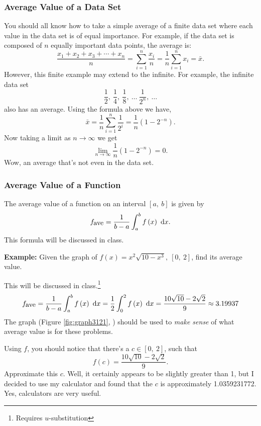 \documentclass[12pt,addpoints, answers, fleqn]{exam}
\begin{document}
\subsubsection{Average Value of a Data Set}

You should all know how to take a simple average of a finite data set where each value in the data set is of equal importance. For example, if the data set is composed of $n$ equally important data points, the average is:
\[
\frac{x_1 + x_2 + x_3 + \cdots + x_n}{n} = \sum\limits_{i = 1}^n \frac{x_i}{n} =  \frac{1}{n} \sum\limits_{i = 1}^n x_i = \bar x.
\]
However, this finite example may extend to the infinite. For example, the infinite data set
\[
\frac{1}{2}, \ \frac{1}{4}, \ \frac{1}{8}, \ \ldots \ \frac{1}{2^n}, \ \ldots
\]
also has an average. Using the formula above we have,
\[
\bar x = \frac{1}{n} \sum\limits_{i = 1}^{n} \frac{1}{2^i} =  \frac{1}{n} \left( 1 - 2^{-n}\right).
\]
Now taking a limit as $n \to \infty$ we get
\[
\mathop {\lim }\limits_{n \to \infty} \frac{1}{n} \left( 1 - 2^{-n}\right) = 0.
\]
Wow, an average that's not even in the data set.

\subsubsection{Average Value of a Function}
The average value of a function on an interval $\left[ a, \ b \right]$ is given by
\[
f_{\mbox{ave}} = \frac{1}{b-a} \int_a^b f \left( x \right) \ {\rm{d}}x.
\]
This formula will be discussed in class. 


\textbf{Example:} Given the graph of $\displaystyle f \left( x \right) = x^2 \sqrt{10 - x^3}, \ \left[ 0, \ 2 \right]$, find its average value.

\begin{solution}
This will be discussed in class.\footnote{Requires $u$-substitution}
\[
f_{\mbox{ave}} = \frac{1}{b-a} \int_a^b f \left( x \right) \ {\rm{d}}x = \frac{1}{2} \int_0^2 f \left( x \right) \ {\rm{d}}x = \frac{10\sqrt{10}-2\sqrt{2}}{9} \approx 3.19937
\]
The graph (Figure \ref{fig:graph3121}, \pageref{fig:graph3121}) should be used to \emph{make sense} of what average value is for these problems.

Using $f$, you should notice that there's a $c \in \left[0, \ 2 \right]$, such that
\[
f \left( c \right) = \frac{10\sqrt{10}-2\sqrt{2}}{9}.
\]
Approximate this $c$. Well, it certainly appears to be slightly greater than 1, but I decided to use my calculator and found that the $c$ is approximately 1.0359231772. Yes, calculators are very useful.
\end{solution}
\end{document}
